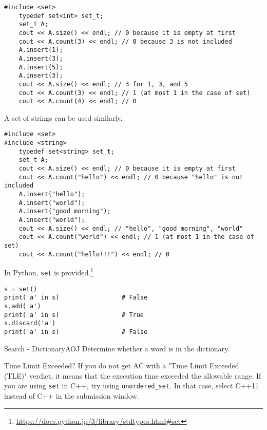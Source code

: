 \begin{cbox}[emph={set}]
\begin{verbatim}
#include <set>
    typedef set<int> set_t;
    set_t A;
    cout << A.size() << endl; // 0 because it is empty at first
    cout << A.count(3) << endl; // 0 because 3 is not included
    A.insert(1);
    A.insert(3);
    A.insert(5);
    A.insert(3);
    cout << A.size() << endl; // 3 for 1, 3, and 5
    cout << A.count(3) << endl; // 1 (at most 1 in the case of set)
    cout << A.count(4) << endl; // 0
\end{verbatim}
\end{cbox}

A set of strings can be used similarly.

\begin{cbox}[emph={set,string}]
\begin{verbatim}
#include <set>
#include <string>
    typedef set<string> set_t;
    set_t A;
    cout << A.size() << endl; // 0 because it is empty at first
    cout << A.count("hello") << endl; // 0 because "hello" is not included
    A.insert("hello");
    A.insert("world");
    A.insert("good morning");
    A.insert("world");
    cout << A.size() << endl; // "hello", "good morning", "world"
    cout << A.count("world") << endl; // 1 (at most 1 in the case of set)
    cout << A.count("hello!!!") << endl; // 0
\end{verbatim}
\end{cbox}

In Python, \texttt{set} is provided.\footnote{\url{https://docs.python.jp/3/library/stdtypes.html\#set}}
\begin{pybox}
\begin{verbatim}
s = set()
print('a' in s)                 # False
s.add('a')
print('a' in s)                 # True
s.discard('a')
print('a' in s)                 # False
\end{verbatim}
\end{pybox}

\begin{psbox}{Search - Dictionary}{AOJ}
Determine whether a word is in the dictionary.

\end{psbox}

\begin{tipsbox}{Time Limit Exceeded?}
If you do not get AC with a "Time Limit Exceeded (TLE)" verdict, it means that the execution time exceeded the allowable range.
If you are using \texttt{set} in C++, try using \texttt{unordered\_set}. In that case, select C++11 instead of C++ in the submission window.
\end{tipsbox}
